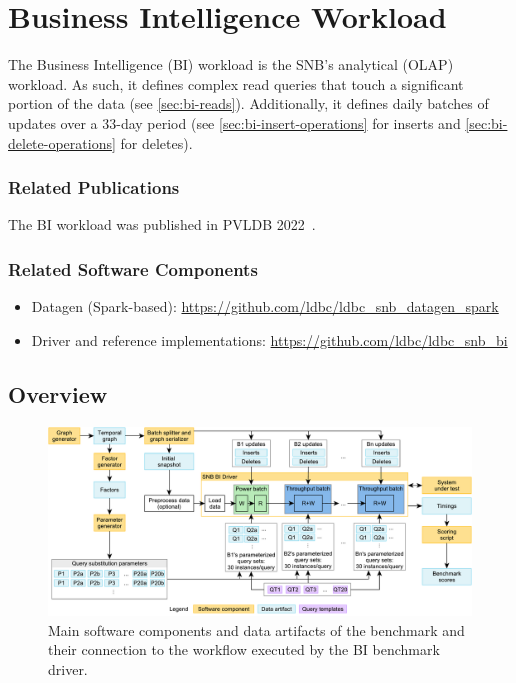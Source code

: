 \chapter{Business Intelligence Workload}
\label{sec:bi}

The Business Intelligence (BI) workload is the SNB's analytical (OLAP) workload.
As such, it defines complex read queries that touch a significant portion of the data (see \autoref{sec:bi-reads}).
Additionally, it defines daily batches of updates over a 33-day period
(see
\autoref{sec:bi-insert-operations} for inserts and
\autoref{sec:bi-delete-operations} for deletes).

\subsection*{Related Publications}

The BI workload was published in PVLDB 2022~\cite{DBLP:journals/pvldb/SzarnyasWSSBWZB22}.

\subsection*{Related Software Components}

\begin{itemize}
    \item Datagen (Spark-based): \url{https://github.com/ldbc/ldbc_snb_datagen_spark}
    \item Driver and reference implementations: \url{https://github.com/ldbc/ldbc_snb_bi}
\end{itemize}


\section{Overview}
\label{sec:bi-benchmark-overview}

\begin{figure}[htb]
    \centering
    \includegraphics[scale=\yedscale]{figures/bi-workflow}
    \caption{Main software components and data artifacts of the benchmark and their connection to the workflow executed by the BI benchmark driver.}
    \label{fig:bi-workflow}
\end{figure}

